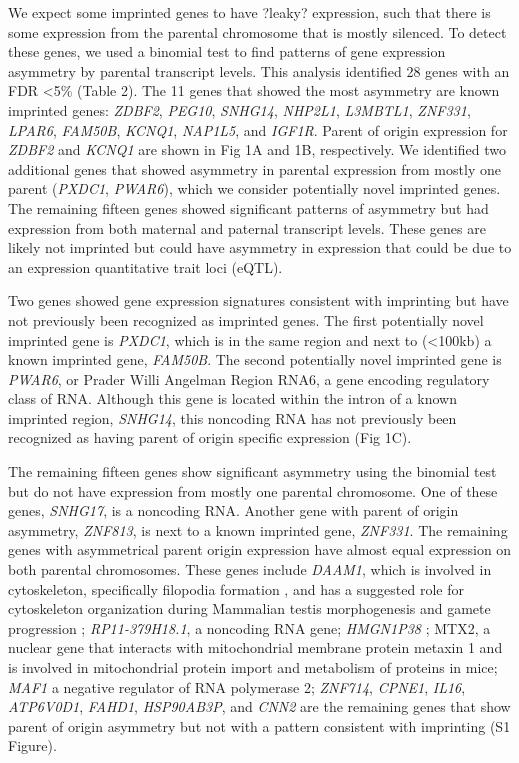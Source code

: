 We expect some imprinted genes to have ?leaky? expression, such that there is some expression from the parental chromosome that is mostly silenced. To detect these genes, we used a binomial test to find patterns of gene expression asymmetry by parental transcript levels.  This analysis identified 28 genes with an FDR <5\% (Table 2). The 11 genes that showed the most asymmetry are known imprinted genes: \emph{ZDBF2}, \emph{PEG10}, \emph{SNHG14}, \emph{NHP2L1}, \emph{L3MBTL1}, \emph{ZNF331}, \emph{LPAR6}, \emph{FAM50B}, \emph{KCNQ1}, \emph{NAP1L5}, and \emph{IGF1R}. Parent of origin expression for \emph{ZDBF2} and \emph{KCNQ1} are shown in Fig 1A and 1B, respectively. We identified two additional genes that showed asymmetry in parental expression from mostly one parent (\emph{PXDC1}, \emph{PWAR6}), which we consider potentially novel imprinted genes. The remaining fifteen genes showed significant patterns of asymmetry but had expression from both maternal and paternal transcript levels. These genes are likely not imprinted but could have asymmetry in expression that could be due to an expression quantitative trait loci (eQTL). 

Two genes showed gene expression signatures consistent with imprinting but have not previously been recognized as imprinted genes. The first potentially novel imprinted gene is \emph{PXDC1}, which is in the same region and next to (<100kb) a known imprinted gene, \emph{FAM50B}. The second potentially novel imprinted gene is \emph{PWAR6}, or Prader Willi Angelman Region RNA6, a gene encoding regulatory class of RNA. Although this gene is located within the intron of a known imprinted region, \emph{SNHG14}, this noncoding RNA has not previously been recognized as having parent of origin specific expression (Fig 1C).

The remaining fifteen genes show significant asymmetry using the binomial test but do not have expression from mostly one parental chromosome. One of these genes, \emph{SNHG17}, is a noncoding RNA. Another gene with parent of origin asymmetry,  \emph{ZNF813}, is next to a known imprinted gene, \emph{ZNF331}. The remaining genes with asymmetrical parent origin expression have almost equal expression on both parental chromosomes. These genes include  \emph{DAAM1},  which is involved in cytoskeleton, specifically filopodia formation \citep{Hoffmann:2014ki, Luo:2016db}, and has a suggested role for cytoskeleton organization during Mammalian testis morphogenesis and gamete progression \citep{Pariante:2016kn};  \emph{RP11-379H18.1}, a noncoding RNA gene;  \emph{HMGN1P38} \citep{StrichmanAlmashanu:2003cw}; MTX2, a nuclear gene that interacts with mitochondrial membrane protein metaxin 1 and is involved in mitochondrial protein import and metabolism of proteins in mice;   \emph{MAF1} a negative regulator of RNA polymerase 2;  \emph{ZNF714},  \emph{CPNE1},  \emph{IL16},  \emph{ATP6V0D1},  \emph{FAHD1},  \emph{HSP90AB3P}, and  \emph{CNN2} are the remaining genes that show parent of origin asymmetry but not with a pattern consistent with imprinting (S1 Figure).

